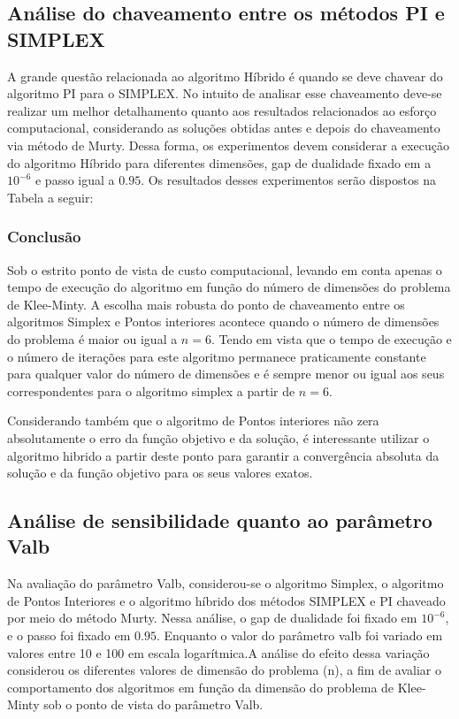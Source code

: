 \documentclass[11pt,a4paper]{article}
\begin{document}
        \newpage
        
    \subsection{Análise do chaveamento entre os métodos PI e SIMPLEX}
    
        A grande questão relacionada ao algoritmo Híbrido é quando se deve chavear do algoritmo PI para o SIMPLEX. No intuito de analisar esse chaveamento deve-se realizar um melhor detalhamento quanto aos resultados relacionados ao esforço computacional, considerando as soluções obtidas antes e depois do chaveamento via método de Murty. Dessa forma, os experimentos devem considerar a execução do algoritmo Híbrido para diferentes dimensões, gap de dualidade fixado em a $10^{-6}$ e passo igual a $0.95$. Os resultados desses experimentos serão dispostos na Tabela a seguir:
        
        
        
        \subsubsection{Conclusão}

        Sob o estrito ponto de vista de custo computacional, levando em conta apenas o tempo de execução do algoritmo em função do número de dimensões do problema de Klee-Minty. A escolha mais robusta do ponto de chaveamento entre os algoritmos Simplex e Pontos interiores acontece quando o número de dimensões do problema é maior ou igual a $n=6$. Tendo em vista que o tempo de execução e o número de iterações para este algoritmo permanece praticamente constante para qualquer valor do número de dimensões e é sempre menor ou igual aos seus correspondentes para o algoritmo simplex a partir de $n=6$.

        Considerando também que o algoritmo de Pontos interiores não zera absolutamente o erro da função objetivo e da solução, é interessante utilizar o algoritmo hibrido a partir deste ponto para garantir a convergência absoluta da solução e da função objetivo para os seus valores exatos.

        \newpage

    \subsection{Análise de sensibilidade quanto ao parâmetro Valb}

     Na avaliação do parâmetro Valb, considerou-se o algoritmo Simplex, o algoritmo de Pontos Interiores e o algoritmo híbrido dos métodos SIMPLEX e PI chaveado por meio do método Murty. Nessa análise, o gap de dualidade foi fixado em $10^{-6}$, e o passo foi fixado em $0.95$. Enquanto o valor do parâmetro valb foi variado em valores entre 10 e 100 em escala logarítmica.A análise do efeito dessa variação  considerou os diferentes valores de dimensão do problema (n), a fim de avaliar o comportamento dos algoritmos em função da dimensão do problema de Klee-Minty sob o ponto de vista do parâmetro Valb. 
        
\end{document}
